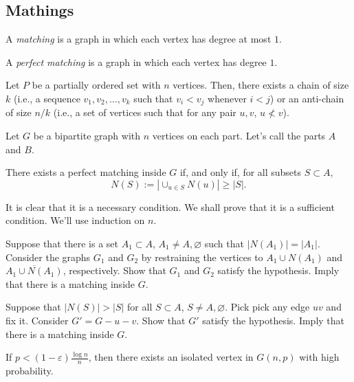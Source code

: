 \subsection{Mathings}

\begin{defn}[Matching]
	A \emph{matching} is a graph in which each vertex has degree at most $1$.

	A \emph{perfect matching} is a graph in which each vertex has degree $1$.
\end{defn}

\begin{thm}[Dilworth]
	Let $P$ be a partially ordered set with $n$ vertices. Then, there exists a chain of size $k$ (i.e., a sequence $v_1, v_2, \dots, v_k$ such that $v_i < v_j$ whenever $i < j$) or an anti-chain of size $n/k$ (i.e., a set of vertices such that for any pair $u, v$, $u \not< v$).
\end{thm}

\begin{thm}
	Let $G$ be a bipartite graph with $n$ vertices on each part. Let's call the parts $A$ and $B$.

	There exists a perfect matching inside $G$ if, and only if, for all subsets $S \subset A$, \[
		N(S) := \left|\cup_{u \in S}N(u)\right|	\ge |S|.
	\]
\end{thm}

\begin{sk}
	It is clear that it is a necessary condition. We shall prove that it is a sufficient condition. We'll use induction on $n$.

	Suppose that there is a set $A_1 \subset A$, $A_1 \neq A, \varnothing$ such that $|N(A_1)| = |A_1|$. Consider the graphs $G_1$ and $G_2$ by restraining the vertices to $A_1 \cup N(A_1)$ and $\overline{A_1 \cup N(A_1)}$, respectively. Show that $G_1$ and $G_2$ satisfy the hypothesis. Imply that there is a matching inside $G$.

	Suppose that $|N(S)| > |S|$ for all $S \subset A$, $S \neq A, \varnothing$. Pick pick any edge $uv$ and fix it. Consider  $G' = G - u - v$. Show that $G'$ satisfy the hypothesis. Imply that there is a matching inside $G$.
\end{sk}

\begin{prop} \label{prop:isolatedvertex}
	If $p < (1-\varepsilon)\frac{\log n}{n}$, then there exists an isolated vertex in $G(n, p)$ with high probability.
\end{prop}

